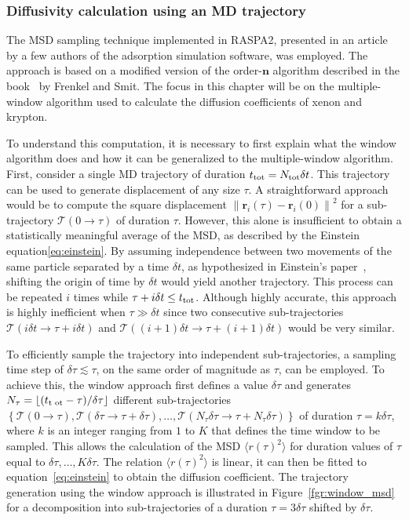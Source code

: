 \documentclass[main]{subfiles}
\begin{document}
\subsubsection{Diffusivity calculation using an MD trajectory}

The MSD sampling technique implemented in RASPA2\autocite{dubbeldam2016}, presented in an article~\cite{Dubbeldam_2009} by a few authors of the adsorption simulation software, was employed. The approach is based on a modified version of the order-$\mathbf{n}$ algorithm described in the book~\cite{frenkel2001msd} by Frenkel and Smit. The focus in this chapter will be on the multiple-window algorithm used to calculate the diffusion coefficients of xenon and krypton.

To understand this computation, it is necessary to first explain what the window algorithm does and how it can be generalized to the multiple-window algorithm. First, consider a single MD trajectory of duration $t_{\text{tot}}=N_{\text{tot}}\delta t$. This trajectory can be used to generate displacement of any size $\tau$. A straightforward approach would be to compute the square displacement ${\lVert\mathbf{r}_i(\tau)-\mathbf{r}_i(0)\rVert}^2$ for a sub-trajectory $\mathcal{T}(0\rightarrow\tau)$ of duration $\tau$. However, this alone is insufficient to obtain a statistically meaningful average of the MSD, as described by the Einstein equation\ref{eq:einstein}. By assuming independence between two movements of the same particle separated by a time $\delta t$, as hypothesized in Einstein's paper~\cite{einstein1905motion}, shifting the origin of time by $\delta t$ would yield another trajectory. This process can be repeated $i$ times while $\tau + i\delta t\leq t_{\text{tot}}$. Although highly accurate, this approach is highly inefficient when $\tau \gg \delta t$ since two consecutive sub-trajectories $\mathcal{T}(i\delta t\rightarrow\tau+i\delta t)$ and $\mathcal{T}((i+1)\delta t\rightarrow\tau+(i+1)\delta t)$ would be very similar. 

To efficiently sample the trajectory into independent sub-trajectories, a sampling time step of $\delta \tau\lesssim\tau$, on the same order of magnitude as $\tau$, can be employed. To achieve this, the window approach first defines a value $\delta \tau$ and generates $N_{\tau} = \lfloor(t_{\text{t ot}} -\tau)/ \delta\tau \rfloor$ different sub-trajectories $\left\{\mathcal{T}(0\rightarrow\tau), \mathcal{T}(\delta\tau\rightarrow\tau + \delta\tau), \ldots, \mathcal{T}(N_{\tau}\delta\tau\rightarrow\tau + N_{\tau}\delta\tau)\right\}$ of duration $\tau=k\delta\tau$, where $k$ is an integer ranging from $1$ to $K$ that defines the time window to be sampled. This allows the calculation of the MSD $\langle {r(\tau)}^2 \rangle$ for duration values of $\tau$ equal to $\delta\tau, \ldots, K\delta\tau$. The relation $\langle {r(\tau)}^2 \rangle$ is linear, it can then be fitted to equation~\ref{eq:einstein} to obtain the diffusion coefficient. The trajectory generation using the window approach is illustrated in Figure~\ref{fgr:window_msd} for a decomposition into sub-trajectories of a duration $\tau=3\delta\tau$ shifted by $\delta\tau$.
\end{document}
